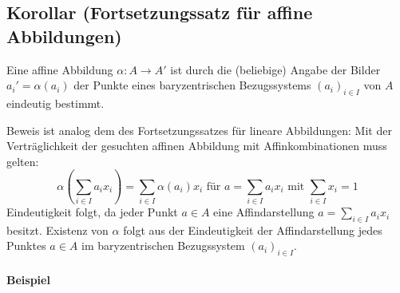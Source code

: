 \subsection{Korollar (Fortsetzungssatz für affine Abbildungen)}
	\begin{Korollar}
		Eine affine Abbildung $ \alpha:A\to A' $ ist durch die (beliebige) Angabe der Bilder $ a_i' = \alpha(a_i) $ der Punkte eines baryzentrischen Bezugssystems $ (a_i)_{i\in I} $ von $ A $ eindeutig bestimmt.
	\end{Korollar}
	Beweis ist analog dem des Fortsetzungssatzes für lineare Abbildungen: Mit der Verträglichkeit der gesuchten affinen Abbildung mit Affinkombinationen muss gelten:
		\[ \alpha\left(\sum_{i\in I}a_ix_i\right)=\sum_{i\in I}\alpha(a_i)x_i \text{ für } a =\sum_{i\in I}a_ix_i \text{ mit } \sum_{i\in I}x_i = 1 \]
	Eindeutigkeit folgt, da jeder Punkt $ a\in A $ eine Affindarstellung $ a = \sum_{i\in I}a_ix_i $ besitzt. Existenz von $ \alpha $ folgt aus der Eindeutigkeit der Affindarstellung jedes Punktes $ a\in A $ im baryzentrischen Bezugssystem $ (a_i)_{i\in I} $.
	
	\paragraph{Beispiel}
    
